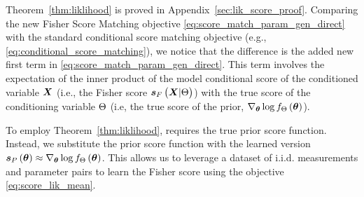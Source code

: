 Theorem~\ref{thm:liklihood} is proved %
in Appendix~\ref{sec:lik_score_proof}. {Comparing the new Fisher Score Matching objective \eqref{eq:score_match_param_gen_direct}
with the standard conditional score matching objective (e.g., \eqref{eq:conditional_score_matching}), we notice that the difference is the added new first term in \eqref{eq:score_match_param_gen_direct}. This term involves the expectation of the inner product of the model conditional score of the conditioned variable $\X$ (i.e., the Fisher score $\lscore{{\X}}{\pr}$) with the true score of the conditioning variable $\Theta$ (i.e, the true score of the prior, $\nabla_{\bm{\theta}}\log f_{\Theta}\left(\bm{\theta}\right)$).}


To employ Theorem~\ref{thm:liklihood}, %
requires the true prior score function. %
Instead, we substitute the prior score function with the learned version $\bm{s}_{P}\left(\bm{\theta}\right)\approx \nabla_{\bm{\theta}}\log f_{\Theta}\left(\bm{\theta}\right)$. This allows us to leverage a dataset of i.i.d. measurements and parameter pairs to learn the Fisher score %
using the objective %
\eqref{eq:score_lik_mean}.
